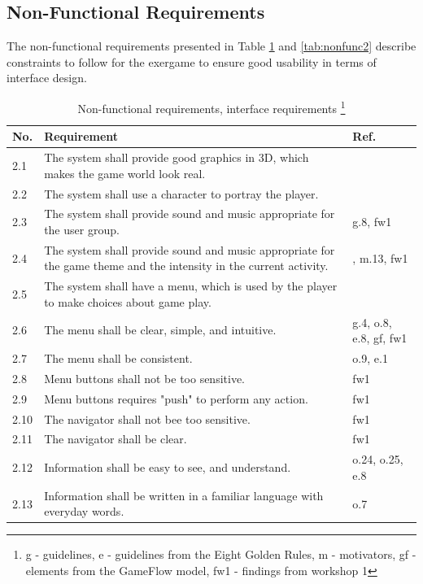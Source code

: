 \subsection{Non-Functional Requirements}
The non-functional requirements presented in Table \ref{tab:nfunc1} and \ref{tab:nonfunc2} describe constraints to follow for the exergame to ensure good usability in terms of interface design.

\begin{minipage}{12 cm}
\begin{table} [H]
\centering
\begin{tabular}{|>{\raggedright}p{}|p{}|p{}|} 
\hline
\textbf{No.} & \textbf{Requirement} & \textbf{Ref.} \\ \hline
2.1 & The system shall provide good graphics in 3D, which makes the game world look real. & \cite{understandingvg} \\ \hline
2.2 & The system shall use a character to portray the player. & \cite{understandingvg} \\ \hline
2.3 & The system shall provide sound and music appropriate for the user group. & g.8, fw1 \\ \hline
2.4 & The system shall provide sound and music appropriate for the game theme and the intensity in the current activity. & \cite{umlapproach}, m.13, fw1 \\ \hline
2.5 & The system shall have a menu, which is used by the player to make choices about game play. & \\ \hline
2.6 & The menu shall be clear, simple, and intuitive. & g.4, o.8, e.8, gf, fw1 \\ \hline
2.7 & The menu shall be consistent. & o.9, e.1 \\ \hline
2.8 & Menu buttons shall not be too sensitive. & fw1 \\ \hline
2.9 & Menu buttons requires "push" to perform any action. &  fw1\\ \hline
2.10 & The navigator shall not bee too sensitive. & fw1\\ \hline
2.11 & The navigator shall be clear. &  fw1\\ \hline
2.12 & Information shall be easy to see, and understand. & o.24, o.25, e.8\\ \hline
2.13 & Information shall be written in a familiar language with everyday words. & o.7\\ \hline
\end{tabular}
\caption[Non-functional requirements, part 1]{Non-functional requirements, interface requirements \footnote{g - guidelines, e - guidelines from the Eight Golden Rules, m - motivators, gf - elements from the GameFlow model, fw1 - findings from workshop 1}}
\label{tab:nfunc1}
\end{table} 
\end{minipage}

